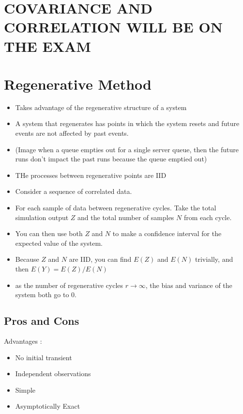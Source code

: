 \documentclass[fleqn]{report}
\begin{document}
\section{COVARIANCE AND CORRELATION WILL BE ON THE EXAM}
 
\section{Regenerative Method }
\begin{itemize}
    \item
    Takes advantage of the regenerative structure of a system 
    \item
    A system that regenerates has points in which the system resets and future 
    events are not affected by past events. 
    \item
    (Image when a queue empties out for a single server queue, then the future 
    runs don't impact the past runs because the queue emptied out)
    \item
    THe processes between regenerative points are IID 
    \item
    Consider a sequence of correlated data. 
    \item
    For each sample of data between regenerative cycles. Take the total 
    simulation output $Z$ and the total number of samples $N$ from each cycle. 
    \item
    You can then use both $Z$ and $N$ to make a confidence interval for the 
    expected value of the system. 
    \item
    Because $Z$ and $N$ are IID, you can find $E(Z)$ and $E(N)$ trivially, and then 
    $E(Y) = E(Z) / E(N)$ 
    \item
    as the number of regenerative cycles $r \to \infty$, the bias and variance 
    of the system both go to 0.
\end{itemize}

\subsection{Pros and Cons}
Advantages :
\begin{itemize}
    \item 
    No initial transient 
    \item 
    Independent observations 
    \item 
    Simple 
    \item 
    Asymptotically Exact 
\end{itemize}
\end{document}
